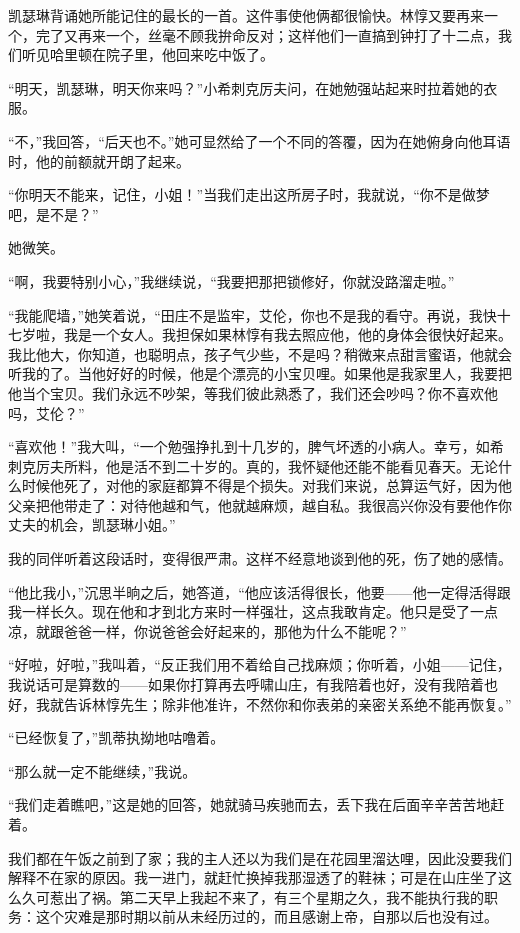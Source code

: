 \par 凯瑟琳背诵她所能记住的最长的一首。这件事使他俩都很愉快。林惇又要再来一个，完了又再来一个，丝毫不顾我拚命反对；这样他们一直搞到钟打了十二点，我们听见哈里顿在院子里，他回来吃中饭了。
\par “明天，凯瑟琳，明天你来吗？”小希刺克厉夫问，在她勉强站起来时拉着她的衣服。
\par “不，”我回答，“后天也不。”她可显然给了一个不同的答覆，因为在她俯身向他耳语时，他的前额就开朗了起来。
\par “你明天不能来，记住，小姐！”当我们走出这所房子时，我就说，“你不是做梦吧，是不是？”
\par 她微笑。
\par “啊，我要特别小心，”我继续说，“我要把那把锁修好，你就没路溜走啦。”
\par “我能爬墙，”她笑着说，“田庄不是监牢，艾伦，你也不是我的看守。再说，我快十七岁啦，我是一个女人。我担保如果林惇有我去照应他，他的身体会很快好起来。我比他大，你知道，也聪明点，孩子气少些，不是吗？稍微来点甜言蜜语，他就会听我的了。当他好好的时候，他是个漂亮的小宝贝哩。如果他是我家里人，我要把他当个宝贝。我们永远不吵架，等我们彼此熟悉了，我们还会吵吗？你不喜欢他吗，艾伦？”
\par “喜欢他！”我大叫，“一个勉强挣扎到十几岁的，脾气坏透的小病人。幸亏，如希刺克厉夫所料，他是活不到二十岁的。真的，我怀疑他还能不能看见春天。无论什么时候他死了，对他的家庭都算不得是个损失。对我们来说，总算运气好，因为他父亲把他带走了：对待他越和气，他就越麻烦，越自私。我很高兴你没有要他作你丈夫的机会，凯瑟琳小姐。”
\par 我的同伴听着这段话时，变得很严肃。这样不经意地谈到他的死，伤了她的感情。
\par “他比我小，”沉思半晌之后，她答道，“他应该活得很长，他要——他一定得活得跟我一样长久。现在他和才到北方来时一样强壮，这点我敢肯定。他只是受了一点凉，就跟爸爸一样，你说爸爸会好起来的，那他为什么不能呢？”
\par “好啦，好啦，”我叫着，“反正我们用不着给自己找麻烦；你听着，小姐——记住，我说话可是算数的——如果你打算再去呼啸山庄，有我陪着也好，没有我陪着也好，我就告诉林惇先生；除非他准许，不然你和你表弟的亲密关系绝不能再恢复。”
\par “已经恢复了，”凯蒂执拗地咕噜着。
\par “那么就一定不能继续，”我说。
\par “我们走着瞧吧，”这是她的回答，她就骑马疾驰而去，丢下我在后面辛辛苦苦地赶着。
\par 我们都在午饭之前到了家；我的主人还以为我们是在花园里溜达哩，因此没要我们解释不在家的原因。我一进门，就赶忙换掉我那湿透了的鞋袜；可是在山庄坐了这么久可惹出了祸。第二天早上我起不来了，有三个星期之久，我不能执行我的职务：这个灾难是那时期以前从未经历过的，而且感谢上帝，自那以后也没有过。
